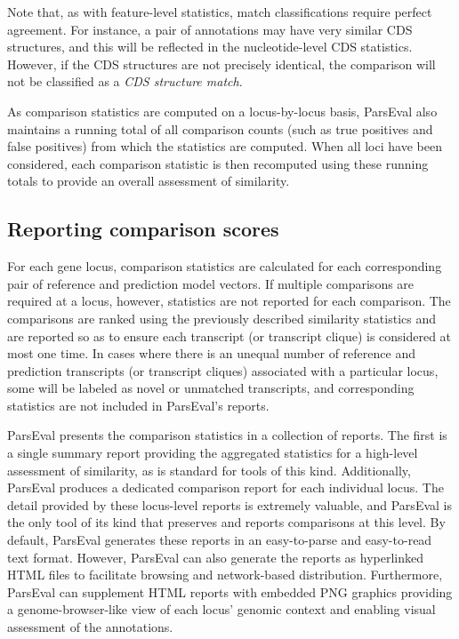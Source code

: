Note that, as with feature-level statistics, match classifications require perfect agreement.
For instance, a pair of annotations may have very similar CDS structures, and this will be reflected in the nucleotide-level CDS statistics.
However, if the CDS structures are not precisely identical, the comparison will not be classified as a \emph{CDS structure match}.

As comparison statistics are computed on a locus-by-locus basis, ParsEval also maintains a running total of all comparison counts (such as true positives and false positives) from which the statistics are computed.
When all loci have been considered, each comparison statistic is then recomputed using these running totals to provide an overall assessment of similarity.


\subsection{Reporting comparison scores}
For each gene locus, comparison statistics are calculated for each corresponding pair of reference and prediction model vectors.
If multiple comparisons are required at a locus, however, statistics are not reported for each comparison.
The comparisons are ranked using the previously described similarity statistics and are reported so as to ensure each transcript (or transcript clique) is considered at most one time.
In cases where there is an unequal number of reference and prediction transcripts (or transcript cliques) associated with a particular locus, some will be labeled as novel or unmatched transcripts, and corresponding statistics are not included in ParsEval's reports.

ParsEval presents the comparison statistics in a collection of reports.
The first is a single summary report providing the aggregated statistics for a high-level assessment of similarity, as is standard for tools of this kind.
Additionally, ParsEval produces a dedicated comparison report for each individual locus.
The detail provided by these locus-level reports is extremely valuable, and ParsEval is the only tool of its kind that preserves and reports comparisons at this level.
By default, ParsEval generates these reports in an easy-to-parse and easy-to-read text format.
However, ParsEval can also generate the reports as hyperlinked HTML files to facilitate browsing and network-based distribution.
Furthermore, ParsEval can supplement HTML reports with embedded PNG graphics providing a genome-browser-like view of each locus' genomic context and enabling visual assessment of the annotations.

